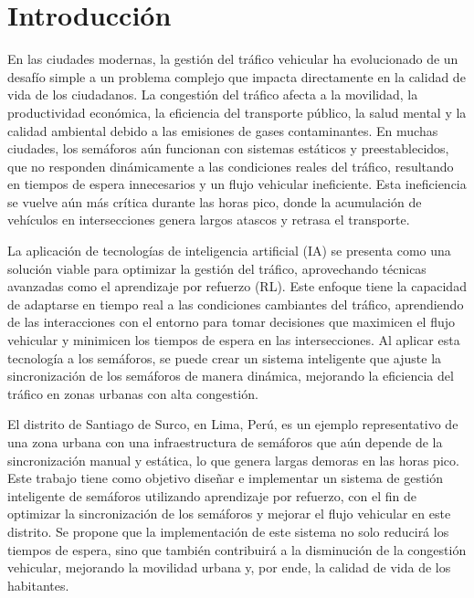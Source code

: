 
\chapter*{Introducción}

En las ciudades modernas, la gestión del tráfico vehicular ha evolucionado de un desafío simple a un problema complejo que impacta directamente en la calidad de vida de los ciudadanos. La congestión del tráfico afecta a la movilidad, la productividad económica, la eficiencia del transporte público, la salud mental y la calidad ambiental debido a las emisiones de gases contaminantes. En muchas ciudades, los semáforos aún funcionan con sistemas estáticos y preestablecidos, que no responden dinámicamente a las condiciones reales del tráfico, resultando en tiempos de espera innecesarios y un flujo vehicular ineficiente. Esta ineficiencia se vuelve aún más crítica durante las horas pico, donde la acumulación de vehículos en intersecciones genera largos atascos y retrasa el transporte.

La aplicación de tecnologías de inteligencia artificial (IA) se presenta como una solución viable para optimizar la gestión del tráfico, aprovechando técnicas avanzadas como el aprendizaje por refuerzo (RL). Este enfoque tiene la capacidad de adaptarse en tiempo real a las condiciones cambiantes del tráfico, aprendiendo de las interacciones con el entorno para tomar decisiones que maximicen el flujo vehicular y minimicen los tiempos de espera en las intersecciones. Al aplicar esta tecnología a los semáforos, se puede crear un sistema inteligente que ajuste la sincronización de los semáforos de manera dinámica, mejorando la eficiencia del tráfico en zonas urbanas con alta congestión.

El distrito de Santiago de Surco, en Lima, Perú, es un ejemplo representativo de una zona urbana con una infraestructura de semáforos que aún depende de la sincronización manual y estática, lo que genera largas demoras en las horas pico. Este trabajo tiene como objetivo diseñar e implementar un sistema de gestión inteligente de semáforos utilizando aprendizaje por refuerzo, con el fin de optimizar la sincronización de los semáforos y mejorar el flujo vehicular en este distrito. Se propone que la implementación de este sistema no solo reducirá los tiempos de espera, sino que también contribuirá a la disminución de la congestión vehicular, mejorando la movilidad urbana y, por ende, la calidad de vida de los habitantes.

